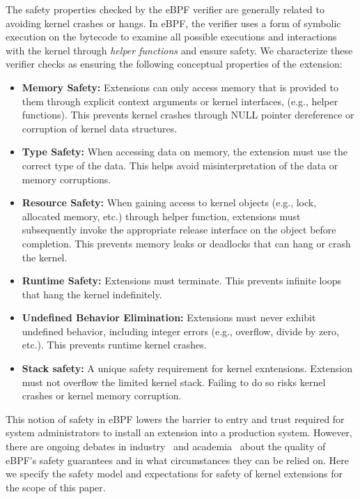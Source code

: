 The safety properties checked by the eBPF verifier are generally
related to avoiding kernel crashes or hangs.  In eBPF, the verifier
uses a form of symbolic execution on the bytecode to examine all
possible executions and interactions with the kernel through {\em
  helper functions} and ensure safety.  We characterize these verifier
checks as ensuring the following conceptual properties of the
extension: 
\begin{itemize}
\item {\bf Memory Safety:} Extensions can only access memory that is
  provided to them through explicit context arguments or kernel
  interfaces, (e.g., helper functions).  This prevents kernel crashes
  through NULL pointer dereference or corruption of kernel data
  structures.
\item {\bf Type Safety:} When accessing data on memory, the extension must use
  the correct type of the data. This helps avoid misinterpretation of the data
  or memory corruptions.
\item {\bf Resource Safety:} When gaining access to kernel objects
  (e.g., lock, allocated memory, etc.) through helper function,
  extensions must subsequently invoke the appropriate release
  interface on the object before completion.  This prevents memory
  leaks or deadlocks that can hang or crash the kernel.
\item {\bf Runtime Safety:} Extensions must terminate. This prevents
  infinite loops that hang the kernel indefinitely.
\item {\bf Undefined Behavior Elimination:} Extensions must never
  exhibit undefined behavior, including integer errors (e.g.,
  overflow, divide by zero, etc.). This prevents runtime kernel
  crashes.
\item {\bf Stack safety:} A unique safety requirement for kernel exntensions.
  Extension must not overflow the limited kernel stack.
  Failing to do so risks kernel crashes or kernel memory corruption.
\end{itemize}

This notion of safety in eBPF lowers the barrier to entry and trust
required for system administrators to install an extension into a
production system.  However, there are ongoing debates in
industry~\cite{reconsider-unpriv-ebpf-lwn,seccomp-ebpf-lwn,ebpf-sec-lwn} and
academia~\cite{untenableVerification} about the quality of eBPF's
safety guarantees and in what circumstances they can be relied on.
Here we specify the safety model and expectations for safety of kernel
extensions for the scope of this paper.

